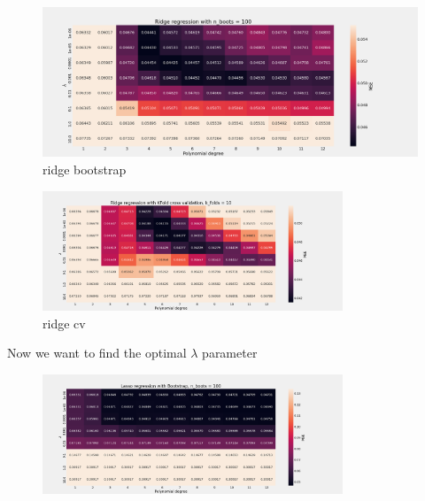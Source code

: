 \begin{figure}[H]
    \centering
    \caption{ridge bootstrap}  
    \label{fig:e_ridge} 
    \includegraphics[width=1\textwidth]{Figures/e_ridge_n_boots_100.png}
\end{figure}

\begin{figure}[H]
    \centering
    \caption{ridge cv}
    \label{fig:e_ridge_kfold}
    \includegraphics[width=0.8\textwidth]{Figures/e_ridge_kfold_n_10.png}
\end{figure}

Now we want to find the optimal $\lambda$ parameter 




\begin{figure}[H]
    \centering
    \includegraphics[width=0.8\textwidth]{Figures/f_lasso_bootstrap_n_100.png}
\end{figure}

